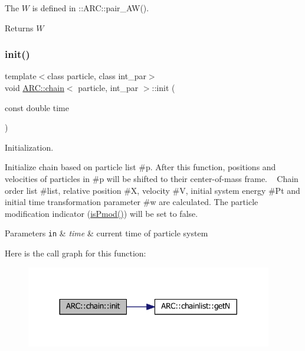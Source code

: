 The $W$ is defined in \+::\+A\+R\+C\+::pair\+\_\+\+A\+W(). \begin{DoxyReturn}{Returns}
$W$ 
\end{DoxyReturn}
\hypertarget{classARC_1_1chain_a3fe37720ceb48c14905c92d3e25e71a4}{}\label{classARC_1_1chain_a3fe37720ceb48c14905c92d3e25e71a4} 
\subsubsection{\texorpdfstring{init()}{init()}}
{\footnotesize\ttfamily template$<$class particle, class int\+\_\+par$>$ \\
void \hyperlink{classARC_1_1chain}{A\+R\+C\+::chain}$<$ particle, int\+\_\+par $>$\+::init (\begin{DoxyParamCaption}\item[{const double}]{time }\end{DoxyParamCaption})\hspace{0.3cm}{\ttfamily [inline]}}



Initialization. 

Initialize chain based on particle list \#p. After this function, positions and velocities of particles in \#p will be shifted to their center-\/of-\/mass frame. ~\newline
 Chain order list \#list, relative position \#X, velocity \#V, initial system energy \#\+Pt and initial time transformation parameter \#w are calculated. The particle modification indicator (\hyperlink{classARC_1_1chain_a29ff9707fe94a554966c885d9bafa819}{is\+Pmod()}) will be set to false. 
\begin{DoxyParams}[1]{Parameters}
\mbox{\tt in}  & {\em time} & current time of particle system \\
\hline
\end{DoxyParams}
Here is the call graph for this function\+:
\nopagebreak
\begin{figure}[H]
\begin{center}
\leavevmode
\includegraphics[width=305pt]{classARC_1_1chain_a3fe37720ceb48c14905c92d3e25e71a4_cgraph}
\end{center}
\end{figure}
\hypertarget{classARC_1_1chain_a1c6de84a911feff1425dfb59e7a89087}{}\label{classARC_1_1chain_a1c6de84a911feff1425dfb59e7a89087} 
